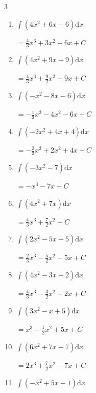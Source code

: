 \begin{multicols}{3}
\begin{enumerate}
  \item $\displaystyle \int \left( 4x^{2}+6x-6 \right) \mathrm{d}x$

        $\displaystyle =\frac{4}{3}x^{3}+3x^{2}-6x+ C$

  \item $\displaystyle \int \left( 4x^{2}+9x+9 \right) \mathrm{d}x$

        $\displaystyle =\frac{4}{3}x^{3}+\frac{9}{2}x^{2}+9x+ C$

  \item $\displaystyle \int \left( -x^{2}-8x-6 \right) \mathrm{d}x$

        $\displaystyle =-\frac{1}{3}x^{3}-4x^{2}-6x+ C$

  \item $\displaystyle \int \left( -2x^{2}+4x+4 \right) \mathrm{d}x$

        $\displaystyle =-\frac{2}{3}x^{3}+2x^{2}+4x+ C$

\columnbreak %

  \item $\displaystyle \int \left( -3x^{2}-7 \right) \mathrm{d}x$

        $\displaystyle =-x^{3}-7x+ C$

  \item $\displaystyle \int \left( 4x^{2}+7x \right) \mathrm{d}x$

        $\displaystyle =\frac{4}{3}x^{3}+\frac{7}{2}x^{2}+ C$

  \item $\displaystyle \int \left( 2x^{2}-5x+5 \right) \mathrm{d}x$

        $\displaystyle =\frac{2}{3}x^{3}-\frac{5}{2}x^{2}+5x+ C$

  \item $\displaystyle \int \left( 4x^{2}-3x-2 \right) \mathrm{d}x$

        $\displaystyle =\frac{4}{3}x^{3}-\frac{3}{2}x^{2}-2x+ C$

  \item $\displaystyle \int \left( 3x^{2}-x+5 \right) \mathrm{d}x$

        $\displaystyle =x^{3}-\frac{1}{2}x^{2}+5x+ C$

  \item $\displaystyle \int \left( 6x^{2}+7x-7 \right) \mathrm{d}x$

        $\displaystyle =2x^{3}+\frac{7}{2}x^{2}-7x+ C$

  \item $\displaystyle \int \left( -x^{2}+5x-1 \right) \mathrm{d}x$


\end{enumerate}
\end{multicols}
